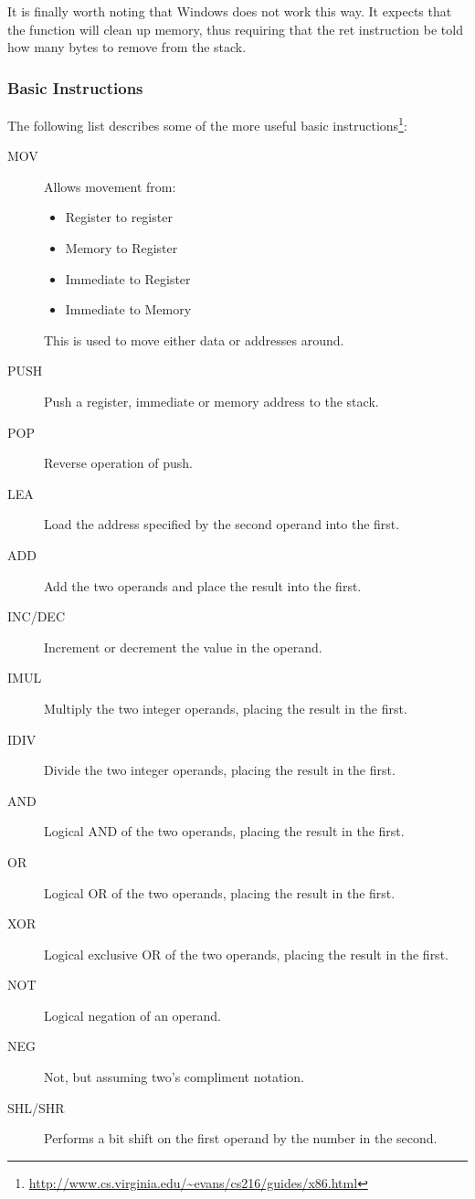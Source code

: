 				It is finally worth noting that Windows does not work this way. 
				It expects that the function will clean up memory, thus requiring that the ret instruction be told how many bytes to remove from the stack. 

			\subsubsection{Basic Instructions}
				The following list describes some of the more useful basic instructions\footnote{\url{http://www.cs.virginia.edu/~evans/cs216/guides/x86.html}}:
				\begin{description}
					\item[MOV] Allows movement from:
						\begin{itemize}
							\item Register to register
							\item Memory to Register
							\item Immediate to Register
							\item Immediate to Memory
						\end{itemize}
						This is used to move either data or addresses around. 
					\item[PUSH] Push a register, immediate or memory address to the stack. 
					\item[POP] Reverse operation of push. 
					\item[LEA] Load the address specified by the second operand into the first. 
					\item[ADD] Add the two operands and place the result into the first. 
					\item[INC/DEC] Increment or decrement the value in the operand. 
					\item[IMUL] Multiply the two integer operands, placing the result in the first. 
					\item[IDIV] Divide the two integer operands, placing the result in the first. 
					\item[AND] Logical AND of the two operands, placing the result in the first. 
					\item[OR] Logical OR of the two operands, placing the result in the first. 
					\item[XOR] Logical exclusive OR of the two operands, placing the result in the first. 
					\item[NOT] Logical negation of an operand. 
					\item[NEG] Not, but assuming two's compliment notation. 
					\item[SHL/SHR] Performs a bit shift on the first operand by the number in the second. 

\end{description}
